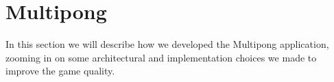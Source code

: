\section{Multipong} %

In this section we will describe how we developed the Multipong application,
zooming in on some architectural and implementation choices we made to improve
the game quality.
